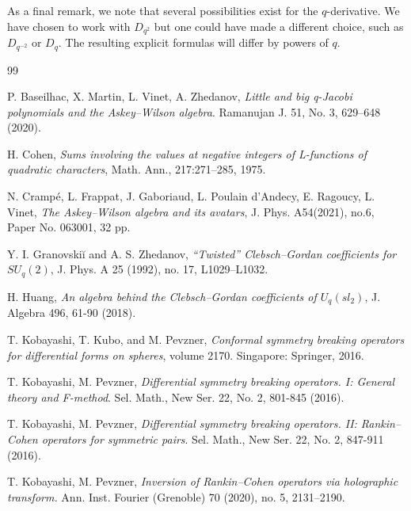 \documentclass[a4paper,12pt]{article}
\numberwithin{equation}{section}
\theoremstyle{rem}
\newenvironment{rema}
  {\pushQED{\qed}\renewcommand{\qedsymbol}{$\scriptstyle{\blacktriangle}$}\remax}
  {\popQED\endremax}
\theoremstyle{definition}
\begin{document}
\begin{rema}
As a final remark, we note that several possibilities exist for the $q$-derivative. We have chosen to work with $D_{q^2}$ but one could have made a different choice, such as $D_{q^{-2}}$ or $D_q$. The resulting explicit formulas will differ by powers of $q$.
\end{rema}





\begin{thebibliography}{99}

 P. Baseilhac, X. Martin, L. Vinet, A. Zhedanov, \emph{Little and big q-Jacobi polynomials and the Askey--Wilson algebra}.
Ramanujan J. 51, No. 3, 629--648 (2020). 

 H. Cohen, \emph{Sums involving the values at negative integers of L-functions of
quadratic characters}, Math. Ann., 217:271–285, 1975.

 N. Crampé, L. Frappat, J. Gaboriaud, L. Poulain d'Andecy, E. Ragoucy, L. Vinet, \emph{The Askey--Wilson algebra and its avatars}, J. Phys. A54(2021), no.6, Paper No. 063001, 32 pp.

 Y. I. Granovskiĭ and A. S. Zhedanov, \emph{“Twisted” Clebsch--Gordan coefficients for $SU_q(2)$}, J.
Phys. A 25 (1992), no. 17, L1029–L1032. 

 H. Huang, \emph{An algebra behind the Clebsch--Gordan coefficients of $U_q(sl_2)$}, J. Algebra 496, 61-90 (2018). 

 T. Kobayashi, T. Kubo, and M. Pevzner, \emph{Conformal symmetry breaking operators for differential forms
on spheres}, volume 2170. Singapore: Springer, 2016.

 T. Kobayashi, M. Pevzner, \emph{Differential symmetry breaking operators. I: General theory and F-method}. Sel. Math., New Ser. 22, No. 2, 801-845 (2016). 

  T. Kobayashi, M. Pevzner,\emph{ Differential symmetry breaking operators. II: Rankin--Cohen operators for symmetric pairs}. Sel. Math., New Ser. 22, No. 2, 847-911 (2016). 

 T. Kobayashi, M. Pevzner, \emph{Inversion of Rankin--Cohen operators via holographic transform.} 
Ann. Inst. Fourier (Grenoble) 70 (2020), no. 5, 2131--2190.


\end{thebibliography}
\end{document}
